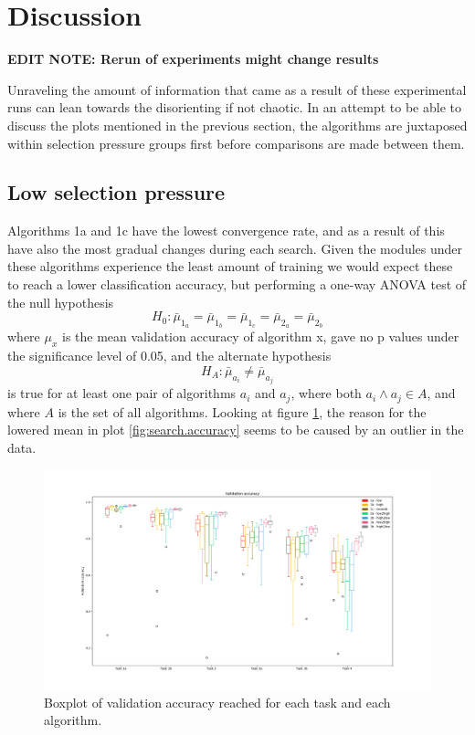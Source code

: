 \section{Discussion}
\textbf{EDIT NOTE: Rerun of experiments might change results}

Unraveling the amount of information that came as a result of these experimental runs can lean towards the disorienting if not chaotic. In an attempt to be able to discuss the plots mentioned in the previous section, the algorithms are juxtaposed within selection pressure groups first before comparisons are made between them. 

\subsection{Low selection pressure}
Algorithms 1a and 1c have the lowest convergence rate, and as a result of this have also the most gradual changes during each search. Given the modules under these algorithms experience the least amount of training we would expect these to reach a lower classification accuracy, but performing a one-way ANOVA test of the null hypothesis
\begin{equation*}
    \label{eq:H0.accuracy.notLowPressure}
    H_{0}:\bar{\mu}_{1_{a}}=\bar{\mu}_{1_{b}}=\bar{\mu}_{1_{c}}=\bar{\mu}_{2_{a}}=\bar{\mu}_{2_{b}}
\end{equation*}
where \(\mu_{x}\) is the mean validation accuracy of algorithm x, gave no p values under the significance level of 0.05, and the alternate hypothesis
\begin{equation*}
    \label{eq:H0.accuracy.notLowPressure}
    H_{A}:\bar{\mu}_{a_{i}} \neq \bar{\mu}_{a_{j}} 
\end{equation*}
is true for at least one pair of algorithms \(a_{i}\) and \(a_{j}\), where both \(a_{i} \land a_{j} \in A\), and where \(A\) is the set of all algorithms. Looking at figure \ref{fig:search.validation}, the reason for the lowered mean in plot \ref{fig:search.accuracy} seems to be caused by an outlier in the data.

\begin{figure}[p!]%
    \includegraphics[width=\textwidth]{Chapters/Experiments/search_algo/figures/validation_boxplot.png}
    \caption{Boxplot of validation accuracy reached for each task and each algorithm.}
    \label{fig:search.validation}
\end{figure}

